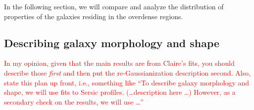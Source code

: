 \documentclass[twocolumn,useAMS,usenatbib]{mn2e}
\newcommand{\rachel}[1]{{\textcolor{red}{#1}}}
\newcommand{\arun}[1]{{\textcolor{blue}{#1}}}
\begin{document}

In the following section, we will compare and analyze the distribution of properties of the galaxies residing in the overdense regions.


\subsection{Describing galaxy morphology and shape}
\label{sub:axisratio}

% 

\rachel{In my opinion, given that the main results are from Claire's
  fits, you should describe those {\em first} and then put the
  re-Gaussianization description second.  Also, state this plan up
  front, i.e., something like ``To describe galaxy morphology and
  shape, we will use fits to Sersic profiles. (\dots description here
  \dots)  However, as a secondary check on the results, we will use \dots''}
\end{document}
